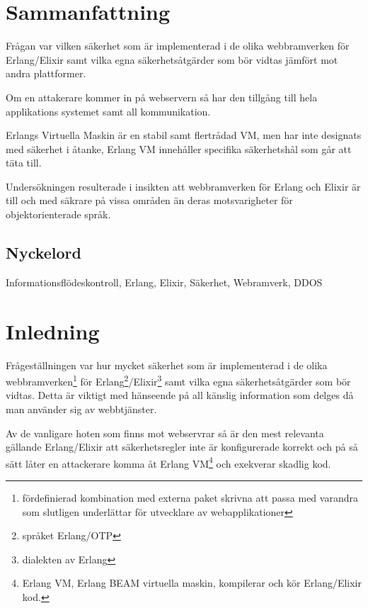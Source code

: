\documentclass[12pt]{article}
\begin{document}
\maketitle

	
\section*{Sammanfattning}
Frågan var vilken säkerhet som är implementerad i de olika webbramverken för Erlang/Elixir samt vilka egna säkerhetsåtgärder som bör vidtas jämfört mot andra plattformer.

Om en attakerare kommer in på webservern så har den tillgång till hela applikations systemet samt all kommunikation.

Erlangs Virtuella Maskin är en stabil samt flertrådad VM, men har inte designats med säkerhet i åtanke, Erlang VM innehåller specifika säkerhetshål som går att täta till.

Undersökningen resulterade i insikten att webbramverken för Erlang och Elixir är till och med säkrare på vissa områden än deras motsvarigheter för objektorienterade språk.

\subsection*{Nyckelord}
Informationsflödeskontroll, Erlang, Elixir, Säkerhet, Webramverk, DDOS
	
\section{Inledning}

Frågeställningen var hur mycket säkerhet som är implementerad i de olika webbramverken\footnote{fördefinierad kombination med externa paket skrivna att passa med varandra som slutligen underlättar för utvecklare av webapplikationer} för Erlang\footnote{språket Erlang/OTP\cite{erlang}}/Elixir\footnote{dialekten av Erlang\cite{elixir}} samt vilka egna säkerhetsåtgärder som bör vidtas.
Detta är viktigt med hänseende på all känslig information som delges då man använder sig av webbtjänster.

Av de vanligare hoten som finns mot webservrar så är den mest relevanta gällande Erlang/Elixir att säkerhetsregler inte är konfigurerade korrekt och på så sätt låter en attackerare komma åt Erlang VM\footnote{Erlang VM, Erlang BEAM virtuella maskin, kompilerar och kör Erlang/Elixir kod\cite{erlang}.} och exekverar skadlig kod. 
\end{document}
